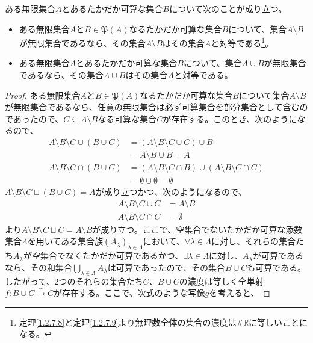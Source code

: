 \documentclass[dvipdfmx]{jsarticle}
\begin{document}
\begin{thm}\label{1.2.7.9}
ある無限集合$A$とあるたかだか可算な集合$B$について次のことが成り立つ。
\begin{itemize}
\item
  ある無限集合$A$と$B \in \mathfrak{P}(A)$なるたかだか可算な集合$B$について、集合$A \setminus B$が無限集合であるなら、その集合$A \setminus B$はその集合$A$と対等である\footnote{定理\ref{1.2.7.8}と定理\ref{1.2.7.9}より無理数全体の集合の濃度は$\# \mathbb{R}$に等しいことになる。}。
\item
  ある無限集合$A$とあるたかだか可算な集合$B$について、集合$A \cup B$が無限集合であるなら、その集合$A \cup B$はその集合$A$と対等である。
\end{itemize}
\end{thm}
\begin{proof}
ある無限集合$A$と$B \in \mathfrak{P}(A)$なるたかだか可算な集合$B$について集合$A \setminus B$が無限集合であるなら、任意の無限集合は必ず可算集合を部分集合として含むのであったので、$C \subseteq A \setminus B$なる可算な集合$C$が存在する。このとき、次のようになるので、
\begin{align*}
A \setminus B \setminus C \cup (B \cup C) &= (A \setminus B \setminus C \cup C) \cup B \\
&= A \setminus B \cup B = A\\
A \setminus B \setminus C \cap (B \cup C) &= (A \setminus B \setminus C \cap B) \cup (A \setminus B \setminus C \cap C) \\
&= \emptyset \cup \emptyset = \emptyset
\end{align*}
$A \setminus B \setminus C \sqcup (B \cup C) = A$が成り立つかつ、次のようになるので、
\begin{align*}
A \setminus B \setminus C \cup C &= A \setminus B\\
A \setminus B \setminus C \cap C &= \emptyset
\end{align*}
より$A \setminus B \setminus C \sqcup C = A \setminus B$が成り立つ。ここで、空集合でないたかだか可算な添数集合$\varLambda$を用いてある集合族$\left( A_{\lambda} \right)_{\lambda \in \varLambda}$において、$\forall\lambda \in \varLambda$に対し、それらの集合たち$A_{\lambda}$が空集合でなくたかだか可算であるかつ、$\exists\lambda \in \varLambda$に対し、$A_{\lambda}$が可算であるなら、その和集合$\bigcup_{\lambda \in \varLambda} A_{\lambda}$は可算であったので、その集合$B \cup C$も可算である。したがって、2つのそれらの集合たち$C$、$B \cup C$の濃度は等しく全単射$f:B \cup C\overset{\sim}{\rightarrow}C$が存在する。ここで、次式のような写像$g$を考えると、

\end{proof}
\end{document}
